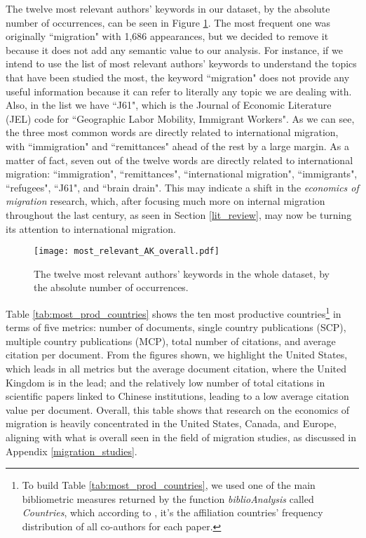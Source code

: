 The twelve most relevant authors' keywords in our dataset, by the absolute number of occurrences, can be seen in Figure \ref{fig:most_relevant_AK}. The most frequent one was originally ``migration" with 1,686 appearances, but we decided to remove it because it does not add any semantic value to our analysis. For instance, if we intend to use the list of most relevant authors' keywords to understand the topics that have been studied the most, the keyword ``migration" does not provide any useful information because it can refer to literally any topic we are dealing with. Also, in the list we have ``J61", which is the Journal of Economic Literature (JEL) code for ``Geographic Labor Mobility, Immigrant Workers". As we can see, the three most common words are directly related to international migration, with ``immigration" and ``remittances" ahead of the rest by a large margin. As a matter of fact, seven out of the twelve words are directly related to international migration: ``immigration", ``remittances", ``international migration", ``immigrants", ``refugees", ``J61", and ``brain drain". This may indicate a shift in the \textit{economics of migration} research, which, after focusing much more on internal migration throughout the last century, as seen in Section \ref{lit_review}, may now be turning its attention to international migration.

\begin{figure}[!ht]
	\centering
	\texttt{[image: most\_relevant\_AK\_overall.pdf]}
	\caption{The twelve most relevant authors' keywords in the whole dataset, by the absolute number of occurrences.}
	\label{fig:most_relevant_AK}
\end{figure}

Table \ref{tab:most_prod_countries} shows the ten most productive countries\footnote{To build Table \ref{tab:most_prod_countries}, we used one of the main bibliometric measures returned by the function \textit{biblioAnalysis} called \textit{Countries}, which according to \cite{aria_bibliometrix_2017}, it's the affiliation countries’ frequency distribution of all co-authors for each paper.} in terms of five metrics: number of documents, single country publications (SCP), multiple country publications (MCP), total number of citations, and average citation per document. From the figures shown, we highlight the United States, which leads in all metrics but the average document citation, where the United Kingdom is in the lead; and the relatively low number of total citations in scientific papers linked to Chinese institutions, leading to a low average citation value per document. Overall, this table shows that research on the economics of migration is heavily concentrated in the United States, Canada, and Europe, aligning with what is overall seen in the field of migration studies, as discussed in Appendix \ref{migration_studies}.

